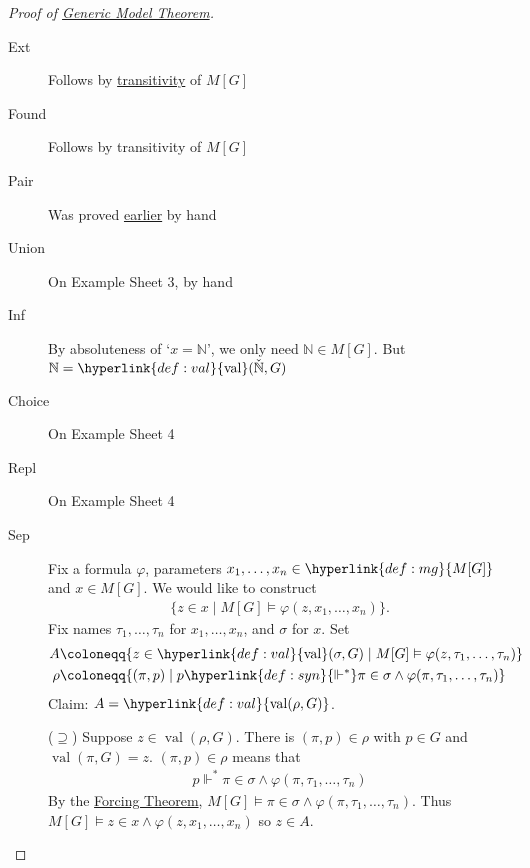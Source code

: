 \documentclass{article}
\newcommand{\1}{\mathbbm{1}}
\DeclareMathOperator{\val}{val}
\let\models\vDash
\let\forces\Vdash
\begin{document}
\begin{proof}[Proof of \hyperlink{thm:genericmodel}{Generic Model Theorem}]\leavevmode
  \begin{description}
    \item[\textsf{Ext}] Follows by \hyperlink{def:transitive}{transitivity} of \hyperlink{def:mg}{$M[G]$}
    \item[\textsf{Found}] Follows by transitivity of $M[G]$
    \item[\textsf{Pair}] Was proved \hyperlink{prop:mgpair}{earlier} by hand
    \item[\textsf{Union}] On Example Sheet 3, by hand
    \item[\textsf{Inf}] By absoluteness of `$x = \mathbb{N}$', we only need $\mathbb{N} \in M[G]$.
      But $\mathbb{N} = \hyperlink{def:val}{\val}(\check{\mathbb{N}},G)$
    \item[\textsf{Choice}] On Example Sheet 4
    \item[\textsf{Repl}] On Example Sheet 4
    \item[\textsf{Sep}] Fix a formula $\varphi$, parameters $x_1, \dotsc, x_n \in \hyperlink{def:mg}{M[G]}$ and $x \in M[G]$. We would like to construct
      \begin{align*}
        \{z \in x \mid M[G] \models \varphi(z, x_1, \dotsc, x_n)\}.
      \end{align*}
      Fix names $\tau_1, \dotsc, \tau_n$ for $x_1, \dotsc, x_n$, and $\sigma$ for $x$.
      Set
      \begin{align*}
        A &\coloneqq \{z \in \hyperlink{def:val}{\val}(\sigma,G) \mid M[G] \models \varphi(z, \tau_1, \dotsc, \tau_n)\} \\
        \rho &\coloneqq \{(\pi,p) \mid p \hyperlink{def:syn}{\forces^*} \pi \in \sigma \land \varphi(\pi, \tau_1, \dotsc, \tau_n)\}
      \end{align*}
      Claim: $A = \hyperlink{def:val}{\val(\rho,G)}$.

      ($\supseteq$) Suppose $z \in \val(\rho,G)$. There is $(\pi,p) \in \rho$ with $p \in G$ and $\val(\pi,G) = z$.
      $(\pi,p) \in \rho$ means that
      \begin{align*}
        p \forces^* \pi \in \sigma \land \varphi(\pi, \tau_1, \dotsc, \tau_n)
      \end{align*}
      By the \hyperlink{thm:forcing}{Forcing Theorem}, $M[G] \models \pi \in \sigma \land \varphi(\pi, \tau_1, \dotsc, \tau_n)$.
      Thus $M[G] \models z \in x \land \varphi(z, x_1, \dotsc, x_n)$
      so $z \in A$.


\end{description}
\end{proof}
\end{document}
